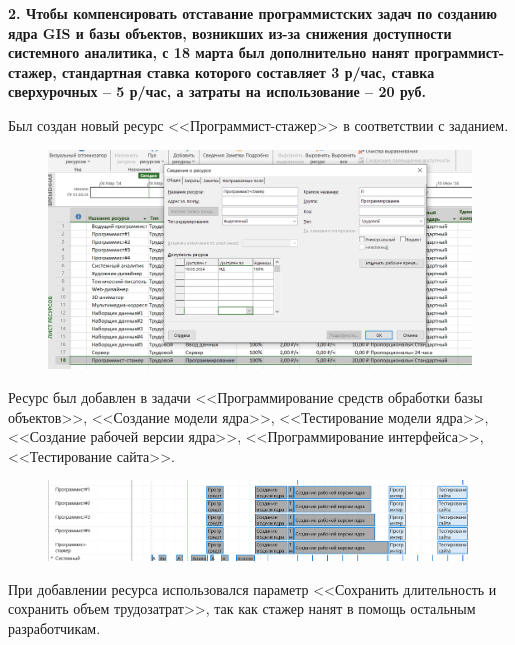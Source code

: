 \newpage

\textbf{2. Чтобы компенсировать отставание программистских задач по созданию ядра GIS и базы объектов, возникших из-за снижения доступности системного аналитика, с 18 марта был дополнительно нанят программист-стажер, стандартная ставка которого составляет 3 р/час, ставка сверхурочных – 5 р/час, а затраты на использование – 20 руб.}

Был создан новый ресурс <<Программист-стажер>> в соответствии с заданием.

\begin{figure}[h!]
	\begin{center}
		\includegraphics[scale=0.45]{inc/img/p_7.png}
	\end{center}
	\captionsetup{justification=centering}
	\label{fig:u3}
\end{figure}

Ресурс был добавлен в задачи <<Программирование средств обработки базы объектов>>, <<Создание модели ядра>>, <<Тестирование модели ядра>>, <<Создание рабочей версии ядра>>, <<Программирование интерфейса>>, <<Тестирование сайта>>.

\begin{figure}[h!]
	\begin{center}
		\includegraphics[scale=0.35]{inc/img/p_8.png}
	\end{center}
	\captionsetup{justification=centering}
	\label{fig:u3}
\end{figure}

При добавлении ресурса использовался параметр <<Сохранить длительность и сохранить объем трудозатрат>>, так как стажер нанят в помощь остальным разработчикам.

